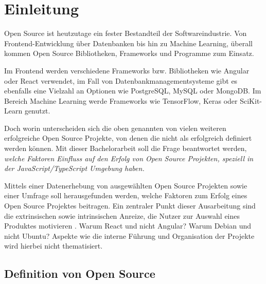 \chapter{Einleitung}




Open Source ist heutzutage ein fester Bestandteil der Softwareindustrie.
Von Frontend-Entwicklung über Datenbanken bis hin zu Machine Learning, überall kommen Open Source
Bibliotheken, Frameworks und Programme zum Einsatz.


Im Frontend werden verschiedene Frameworks bzw. Bibliotheken wie Angular oder React verwendet,
im Fall von Datenbankmanagementsysteme gibt es ebenfalls eine Vielzahl an Optionen
wie PostgreSQL, MySQL oder MongoDB.
Im Bereich Machine Learning werde Frameworks wie TensorFlow, Keras oder SciKit-Learn genutzt.



Doch worin unterscheiden sich die oben genannten von vielen weiteren erfolgreiche Open Source
Projekte, von denen die nicht als erfolgreich definiert werden können.
Mit dieser Bachelorarbeit soll die Frage beantwortet werden, \textit{welche Faktoren Einfluss auf
    den Erfolg von Open Source Projekten, speziell in der JavaScript/TypeScript Umgebung haben.}


Mittels einer Datenerhebung von ausgewählten Open Source Projekten sowie einer
Umfrage soll herausgefunden werden, welche Faktoren zum Erfolg eines Open Source Projektes beitragen.
Ein zentraler Punkt dieser Ausarbeitung sind die extrinsischen sowie intrinsischen Anreize, %
die Nutzer zur Auswahl eines Produktes motivieren \cite{midhaFactorsAffectingSuccess2012}. %
Warum React und nicht Angular? Warum Debian und nicht Ubuntu?
Aspekte wie die interne Führung und Organisation der Projekte wird hierbei nicht thematisiert.




\section{Definition von Open Source}


